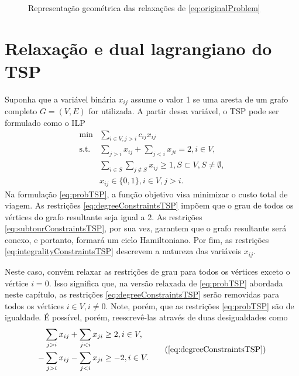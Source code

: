 {\begin{figure}[!ht]
	\caption{Representação geométrica das relaxações de \eqref{eq:originalProblem}}
		\label{fig:figuraMonique}
\end{figure}

\section{Relaxação e dual lagrangiano do TSP}

Suponha que a variável binária $x_{ij}$ assume o valor 1 se uma aresta de um grafo completo $G = (V,E)$ for utilizada. A partir dessa variável, o TSP pode ser formulado como o ILP
\begin{align}
	\min & \sum_{i \in V, j > i} c_{ij} x_{ij}  \tag{TSP}\label{eq:probTSP} \\
	\text{s.t. } & \sum_{j>i} x_{ij} + \sum_{j<i} x_{ji} = 2, i \in V, \label{eq:degreeConstraintsTSP} \\
	& \sum_{i \in S}\sum_{j \notin S} x_{ij} \geq 1, S \subset V, S \neq \emptyset, \label{eq:subtourConstraintsTSP} \\
	& x_{ij} \in \{0,1\}, i \in V, j > i. \label{eq:integralityConstraintsTSP}
\end{align}
Na formulação \eqref{eq:probTSP}, a função objetivo visa minimizar o custo total de viagem. As restrições \eqref{eq:degreeConstraintsTSP} impõem que o grau de todos os vértices do grafo resultante seja igual a 2. As restrições \eqref{eq:subtourConstraintsTSP}, por sua vez, garantem que o grafo resultante será conexo, e portanto, formará um ciclo Hamiltoniano. Por fim, as restrições \eqref{eq:integralityConstraintsTSP} descrevem a natureza das variáveis $x_{ij}$. 

Neste caso, convém relaxar as restrições de grau para todos os vértices exceto o vértice $i = 0$. Isso significa que, na versão relaxada de \eqref{eq:probTSP} abordada neste capítulo, as restrições \eqref{eq:degreeConstraintsTSP} serão removidas para todos os vértices $i \in V, i \neq 0$. Note, porém, que as restrições \eqref{eq:probTSP} são de igualdade. É possível, porém, reescrevê-las através de duas desigualdades como
\begin{equation}
\begin{aligned}
	\sum_{j>i} x_{ij} + \sum_{j<i} x_{ji} &\geq 2, i \in V,  \\
	-\sum_{j>i} x_{ij} - \sum_{j<i} x_{ji} &\geq -2, i \in V. 
\end{aligned}\tag{\ref{eq:degreeConstraintsTSP}}
\end{equation}

}

